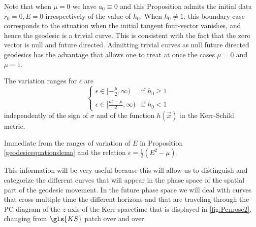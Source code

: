 \begin{Remark}
Note that when $\mu=0$ we have $a_0 \equiv 0$
and this Proposition admits the initial data 
$\dot{r}_0 =0, E=0$ irrespectively
of the value of $h_0$. When $h_0\neq 1$, this boundary case corresponds to the
situation when the initial tangent four-vector 
vanishes, and hence the geodesic is a trivial curve. This is consistent
with the fact that the zero vector is null and future directed.
Admitting trivial curves as null future directed geodesics
has the advantage that allows one to treat at once the cases $\mu =0$ and
$\mu =1 $. 
\end{Remark}

\begin{corollary}\label{epsilonrange}
The variation ranges for $\epsilon$ are
\begin{equation}
\begin{cases}
\epsilon \in [-\frac{\mu}{2},\infty) &\mbox{if } h_0 \geq 1\\
\epsilon \in [\frac{a_0^2-\mu}{2},\infty) &\mbox{if } h_0<1
\end{cases}
\end{equation}
independently of the sign of $\sigma$  and of the function $h(\vec{x})$ in the 
Kerr-Schild metric.
\end{corollary}
\begin{Proof} Immediate from the ranges of variation of $E$
in Proposition \ref{geodesicequationslema} 
and the relation $\epsilon=\frac{1}{2} (E^2-\mu)$.
\end{Proof}

This information will be very useful because this will allow us to distinguish and categorize the different curves that will appear in the phase space of the spatial part of the geodesic movement. In the future phase space we will deal with curves that cross multiple time the different horizons and that are traveling through the \gls{PC} diagram of the $z$-axis of the Kerr spacetime that is displayed in \cref{fig:Penrose2}, changing from $\gls{KS}$ patch over and over.

